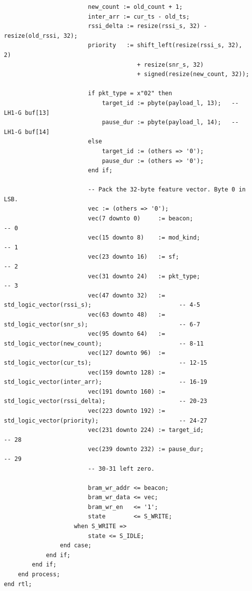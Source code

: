 \documentclass[11pt,letterpaper]{article}
\begin{document}
\begin{lstlisting}
                        new_count := old_count + 1;
                        inter_arr := cur_ts - old_ts;
                        rssi_delta := resize(rssi_s, 32) - resize(old_rssi, 32);
                        priority   := shift_left(resize(rssi_s, 32), 2)
                                      + resize(snr_s, 32)
                                      + signed(resize(new_count, 32));

                        if pkt_type = x"02" then
                            target_id := pbyte(payload_l, 13);   -- LH1-G buf[13]
                            pause_dur := pbyte(payload_l, 14);   -- LH1-G buf[14]
                        else
                            target_id := (others => '0');
                            pause_dur := (others => '0');
                        end if;

                        -- Pack the 32-byte feature vector. Byte 0 in LSB.
                        vec := (others => '0');
                        vec(7 downto 0)     := beacon;                                           -- 0
                        vec(15 downto 8)    := mod_kind;                                         -- 1
                        vec(23 downto 16)   := sf;                                               -- 2
                        vec(31 downto 24)   := pkt_type;                                         -- 3
                        vec(47 downto 32)   := std_logic_vector(rssi_s);                         -- 4-5
                        vec(63 downto 48)   := std_logic_vector(snr_s);                          -- 6-7
                        vec(95 downto 64)   := std_logic_vector(new_count);                      -- 8-11
                        vec(127 downto 96)  := std_logic_vector(cur_ts);                         -- 12-15
                        vec(159 downto 128) := std_logic_vector(inter_arr);                      -- 16-19
                        vec(191 downto 160) := std_logic_vector(rssi_delta);                     -- 20-23
                        vec(223 downto 192) := std_logic_vector(priority);                       -- 24-27
                        vec(231 downto 224) := target_id;                                        -- 28
                        vec(239 downto 232) := pause_dur;                                        -- 29
                        -- 30-31 left zero.

                        bram_wr_addr <= beacon;
                        bram_wr_data <= vec;
                        bram_wr_en   <= '1';
                        state        <= S_WRITE;
                    when S_WRITE =>
                        state <= S_IDLE;
                end case;
            end if;
        end if;
    end process;
end rtl;
\end{lstlisting}
\end{document}

